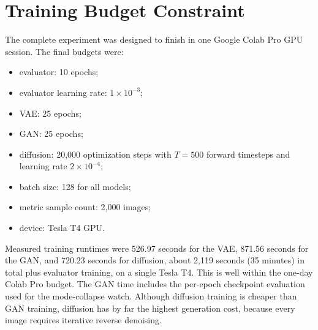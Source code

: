\documentclass[11pt]{article}
\begin{document}
\section*{Training Budget Constraint}

The complete experiment was designed to finish in one Google Colab Pro GPU session. The final budgets were:
\begin{itemize}
\item evaluator: 10 epochs;
\item evaluator learning rate: $1\times10^{-3}$;
\item VAE: 25 epochs;
\item GAN: 25 epochs;
\item diffusion: 20,000 optimization steps with $T=500$ forward timesteps and learning rate $2\times10^{-4}$;
\item batch size: 128 for all models;
\item metric sample count: 2,000 images;
\item device: Tesla T4 GPU.
\end{itemize}

Measured training runtimes were 526.97 seconds for the VAE, 871.56 seconds for the GAN, and 720.23 seconds for diffusion, about 2,119 seconds (35 minutes) in total plus evaluator training, on a single Tesla T4. This is well within the one-day Colab Pro budget. The GAN time includes the per-epoch checkpoint evaluation used for the mode-collapse watch. Although diffusion training is cheaper than GAN training, diffusion has by far the highest generation cost, because every image requires iterative reverse denoising.
\end{document}
